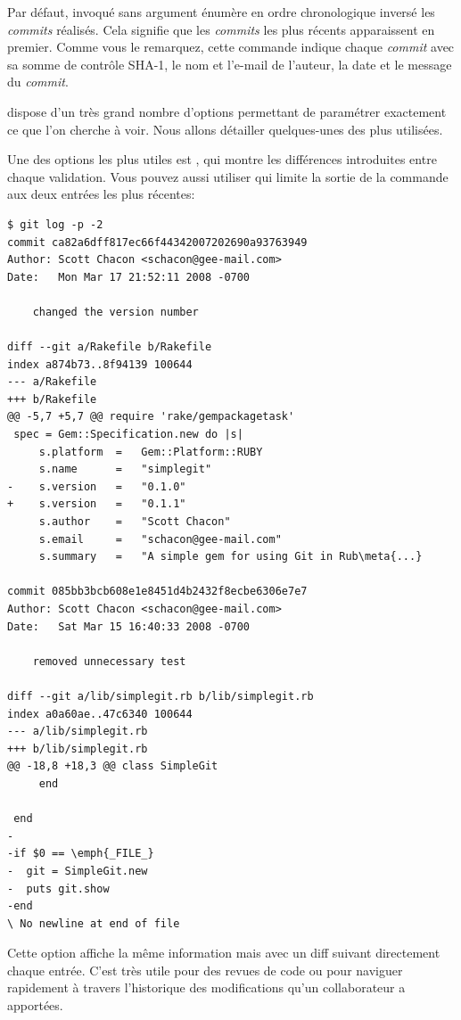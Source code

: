 Par défaut,  invoqué sans argument énumère en ordre chronologique inversé les \emph{commits} réalisés.
Cela signifie que les \emph{commits} les plus récents apparaissent en premier.
Comme vous le remarquez, cette commande indique chaque \emph{commit} avec sa somme de contrôle SHA-1, le nom et l'e-mail de l'auteur, la date et le message du \emph{commit}.

 dispose d'un très grand nombre d'options permettant de paramétrer exactement ce que l'on cherche à voir.
Nous allons détailler quelques-unes des plus utilisées.

Une des options les plus utiles est , qui montre les différences introduites entre chaque validation.
Vous pouvez aussi utiliser  qui limite la sortie de la commande aux deux entrées les plus récentes:
\begin{Schunk}
\begin{Verbatim}[commandchars=\\\{\}]
$ git log -p -2
commit ca82a6dff817ec66f44342007202690a93763949
Author: Scott Chacon <schacon@gee-mail.com>
Date:   Mon Mar 17 21:52:11 2008 -0700

    changed the version number

diff --git a/Rakefile b/Rakefile
index a874b73..8f94139 100644
--- a/Rakefile
+++ b/Rakefile
@@ -5,7 +5,7 @@ require 'rake/gempackagetask'
 spec = Gem::Specification.new do |s|
     s.platform  =   Gem::Platform::RUBY
     s.name      =   "simplegit"
-    s.version   =   "0.1.0"
+    s.version   =   "0.1.1"
     s.author    =   "Scott Chacon"
     s.email     =   "schacon@gee-mail.com"
     s.summary   =   "A simple gem for using Git in Rub\meta{...}

commit 085bb3bcb608e1e8451d4b2432f8ecbe6306e7e7
Author: Scott Chacon <schacon@gee-mail.com>
Date:   Sat Mar 15 16:40:33 2008 -0700

    removed unnecessary test

diff --git a/lib/simplegit.rb b/lib/simplegit.rb
index a0a60ae..47c6340 100644
--- a/lib/simplegit.rb
+++ b/lib/simplegit.rb
@@ -18,8 +18,3 @@ class SimpleGit
     end

 end
-
-if $0 == \emph{_FILE_}
-  git = SimpleGit.new
-  puts git.show
-end
\ No newline at end of file
\end{Verbatim}
\end{Schunk}

Cette option affiche la même information mais avec un diff suivant directement chaque entrée.
C'est très utile pour des revues de code ou pour naviguer rapidement à travers l'historique des modifications qu'un collaborateur a apportées.

